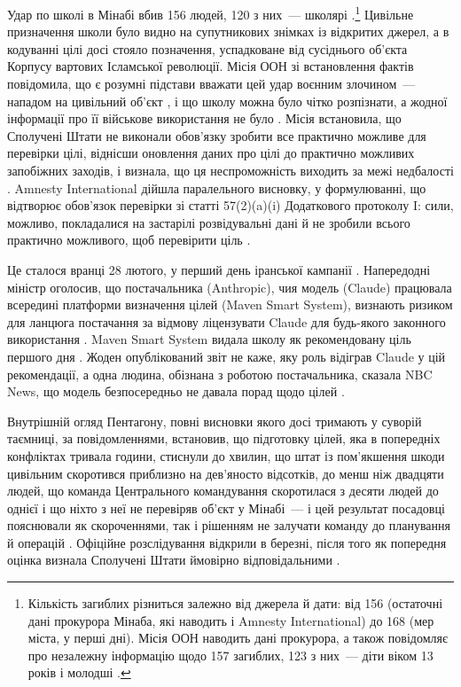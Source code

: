 Удар по школі в Мінабі вбив 156 людей, 120 з них~— школярі \autocite[п.~92]{UNFFMIran2026}.\footnote{Кількість загиблих різниться залежно від джерела й дати: від 156 (остаточні дані прокурора Мінаба, які наводить і Amnesty International) до 168 (мер міста, у перші дні). Місія ООН наводить дані прокурора, а також повідомляє про незалежну інформацію щодо 157 загиблих, 123 з них~— діти віком 13 років і молодші \autocite[пп.~92–93]{UNFFMIran2026}.} Цивільне призначення школи було видно на супутникових знімках із відкритих джерел, а в кодуванні цілі досі стояло позначення, успадковане від сусіднього об’єкта Корпусу вартових Ісламської революції. Місія ООН зі встановлення фактів повідомила, що є розумні підстави вважати цей удар воєнним злочином~— нападом на цивільний об’єкт \autocite{ohchr2026minabpress}, і що школу можна було чітко розпізнати, а жодної інформації про її військове використання не було \autocite[пп.~81–86, 124–126]{UNFFMIran2026}. Місія встановила, що Сполучені Штати не виконали обов’язку зробити все практично можливе для перевірки цілі, віднісши оновлення даних про цілі до практично можливих запобіжних заходів, і визнала, що ця неспроможність виходить за межі недбалості \autocite[пп.~124–125]{UNFFMIran2026}. Amnesty International дійшла паралельного висновку, у формулюванні, що відтворює обов’язок перевірки зі статті 57(2)(a)(i) Додаткового протоколу I: сили, можливо, покладалися на застарілі розвідувальні дані й не зробили всього практично можливого, щоб перевірити ціль \autocite{Amnesty2026Minab}.

Це сталося вранці 28 лютого, у перший день іранської кампанії \autocite{Amnesty2026Minab,crs2026iranwar}. Напередодні міністр оголосив, що постачальника (Anthropic), чия модель (Claude) працювала всередині платформи визначення цілей (Maven Smart System), визнають ризиком для ланцюга постачання за відмову ліцензувати Claude для будь-якого законного використання \autocite{npr2026openai}. Maven Smart System видала школу як рекомендовану ціль першого дня \autocite{livingstone2026maven,gizmodo2026minab}. Жоден опублікований звіт не каже, яку роль відіграв Claude у цій рекомендації, а одна людина, обізнана з роботою постачальника, сказала NBC News, що модель безпосередньо не давала порад щодо цілей \autocite{nbc2026targeting}.

Внутрішній огляд Пентагону, повні висновки якого досі тримають у суворій таємниці, за повідомленнями, встановив, що підготовку цілей, яка в попередніх конфліктах тривала години, стиснули до хвилин, що штат із пом’якшення шкоди цивільним скоротився приблизно на дев’яносто відсотків, до менш ніж двадцяти людей, що команда Центрального командування скоротилася з десяти людей до однієї і що ніхто з неї не перевіряв об’єкт у Мінабі~— і цей результат посадовці пояснювали як скороченнями, так і рішенням не залучати команду до планування й операцій \autocite{Bloomberg2026KillChain}. Офіційне розслідування відкрили в березні, після того як попередня оцінка визнала Сполучені Штати ймовірно відповідальними \autocite{NPR2026MinabProbe}.

